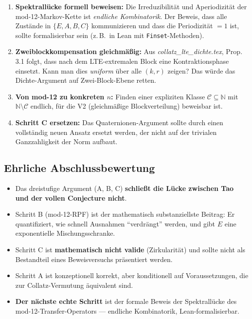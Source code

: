 \documentclass[12pt,a4paper]{article}
\newcommand{\N}{\mathbb{N}}
\begin{document}
\begin{enumerate}[label=(\Roman*)]
  \item \textbf{Spektrallücke formell beweisen:} Die Irreduzibilität
    und Aperiodizität der mod-12-Markov-Kette ist \emph{endliche Kombinatorik}.
    Der Beweis, dass alle Zustände in $\{E,A,B,C\}$ kommunizieren
    und dass die Periodizität $= 1$ ist, sollte formalisierbar sein
    (z.\,B.\ in Lean mit \texttt{Finset}-Methoden).

  \item \textbf{Zweiblockkompensation gleichmäßig:} Aus
    \textit{collatz\_lte\_dichte.tex}, Prop.\,3.1 folgt, dass nach dem
    LTE-extremalen Block eine Kontraktionsphase einsetzt. Kann man dies
    \emph{uniform} über alle $(k,r)$ zeigen? Das würde das
    Dichte-Argument auf Zwei-Block-Ebene retten.

  \item \textbf{Von mod-12 zu konkreten $n$:} Finden einer expliziten
    Klasse $\mathcal{C} \subseteq \N$ mit $\N \setminus \mathcal{C}$
    endlich, für die V2 (gleichmäßige Blockverteilung) beweisbar ist.

  \item \textbf{Schritt C ersetzen:} Das Quaternionen-Argument sollte
    durch einen vollständig neuen Ansatz ersetzt werden, der nicht
    auf der trivialen Ganzzahligkeit der Norm aufbaut.
\end{enumerate}

\subsection{Ehrliche Abschlussbewertung}

\begin{tcolorbox}[warnung, title={Ehrliche Gesamtbilanz}]
\begin{itemize}[nosep]
  \item Das dreistufige Argument (A, B, C) \textbf{schließt die Lücke
    zwischen Tao und der vollen Conjecture nicht}.
  \item Schritt B (mod-12-RPF) ist der mathematisch substanziellste
    Beitrag: Er quantifiziert, wie schnell Ausnahmen ``verdrängt''
    werden, und gibt $E$ eine exponentielle Mischungsschranke.
  \item Schritt C ist \textbf{mathematisch nicht valide} (Zirkularität)
    und sollte nicht als Bestandteil eines Beweisversuchs präsentiert werden.
  \item Schritt A ist konzeptionell korrekt, aber konditionell auf
    Voraussetzungen, die zur Collatz-Vermutung äquivalent sind.
  \item \textbf{Der nächste echte Schritt} ist der formale Beweis der
    Spektrallücke des mod-12-Transfer-Operators --- endliche Kombinatorik,
    Lean-formalisierbar.
\end{itemize}
\end{tcolorbox}
\end{document}

